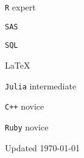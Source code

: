 \documentclass[12pt,letterpaper]{report}
\newcommand{\listitemspace}{0.15em}
\renewenvironment{itemize}
{\begin{list}{}{\setlength{\leftmargin}{0em}
            \setlength{\parskip}{0em}
            \setlength{\itemsep}{\listitemspace}
            \setlength{\parsep}{\listitemspace}}}
    {\end{list}}
\begin{document}
    \begin{itemize}

        \item \texttt{R} \tab expert
        
        \item \texttt{SAS}
        
        \item \texttt{SQL}
        
        \item \LaTeX
        
        \item \texttt{Julia} \tab intermediate
        
        \item \texttt{C++} \tab novice
        
        \item \texttt{Ruby} \tab novice

    \end{itemize}

    \begin{center}
        \vfill
        Updated \monthyeardate\today
    \end{center}
\end{document}
